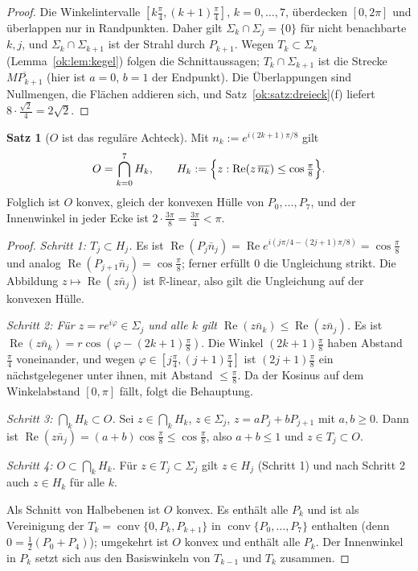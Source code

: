 \documentclass[a4paper,12pt,twoside]{report}
\theoremstyle{definition}
\newtheorem{satz}{Satz}
\begin{document}
\begin{proof}
Die Winkelintervalle $[k\frac\pi4,(k+1)\frac\pi4]$, $k=0,\dots,7$, überdecken $[0,2\pi]$ und überlappen nur in Randpunkten. Daher gilt $\Sigma_k\cap\Sigma_j=\{0\}$ für nicht benachbarte $k,j$, und $\Sigma_k\cap\Sigma_{k+1}$ ist der Strahl durch $P_{k+1}$. Wegen $T_k\subset\Sigma_k$ (Lemma~\ref{ok:lem:kegel}) folgen die Schnittaussagen; $T_k\cap\Sigma_{k+1}$ ist die Strecke $\overline{MP_{k+1}}$ (hier ist $a=0$, $b=1$ der Endpunkt). Die Überlappungen sind Nullmengen, die Flächen addieren sich, und Satz~\ref{ok:satz:dreieck}(f) liefert $8\cdot\frac{\sqrt2}4=2\sqrt2$.
\end{proof}

\begin{satz}[$O$ ist das reguläre Achteck]\label{ok:satz:konvex}
Mit $n_k:=e^{i(2k+1)\pi/8}$ gilt
\[
O=\bigcap_{k=0}^7H_k,\qquad H_k:=\Bigl\{z:\operatorname{Re}(z\,\overline{n_k})\le\cos\tfrac\pi8\Bigr\}.
\]
Folglich ist $O$ konvex, gleich der konvexen Hülle von $P_0,\dots,P_7$, und der Innenwinkel in jeder Ecke ist $2\cdot\frac{3\pi}8=\frac{3\pi}4<\pi$.
\end{satz}

\begin{proof}
\emph{Schritt 1: $T_j\subset H_j$.} Es ist $\operatorname{Re}(P_j\bar n_j)=\operatorname{Re}e^{i(j\pi/4-(2j+1)\pi/8)}=\cos\frac\pi8$ und analog $\operatorname{Re}(P_{j+1}\bar n_j)=\cos\frac\pi8$; ferner erfüllt $0$ die Ungleichung strikt. Die Abbildung $z\mapsto\operatorname{Re}(z\bar n_j)$ ist $\mathbb{R}$-linear, also gilt die Ungleichung auf der konvexen Hülle.

\emph{Schritt 2: Für $z=re^{i\varphi}\in\Sigma_j$ und alle $k$ gilt $\operatorname{Re}(z\bar n_k)\le\operatorname{Re}(z\bar n_j)$.} Es ist $\operatorname{Re}(z\bar n_k)=r\cos(\varphi-(2k+1)\frac\pi8)$. Die Winkel $(2k+1)\frac\pi8$ haben Abstand $\frac\pi4$ voneinander, und wegen $\varphi\in[j\frac\pi4,(j+1)\frac\pi4]$ ist $(2j+1)\frac\pi8$ ein nächstgelegener unter ihnen, mit Abstand $\le\frac\pi8$. Da der Kosinus auf dem Winkelabstand $[0,\pi]$ fällt, folgt die Behauptung.

\emph{Schritt 3: $\bigcap_kH_k\subset O$.} Sei $z\in\bigcap_kH_k$, $z\in\Sigma_j$, $z=aP_j+bP_{j+1}$ mit $a,b\ge0$. Dann ist $\operatorname{Re}(z\bar n_j)=(a+b)\cos\frac\pi8\le\cos\frac\pi8$, also $a+b\le1$ und $z\in T_j\subset O$.

\emph{Schritt 4: $O\subset\bigcap_kH_k$.} Für $z\in T_j\subset\Sigma_j$ gilt $z\in H_j$ (Schritt 1) und nach Schritt 2 auch $z\in H_k$ für alle $k$.

Als Schnitt von Halbebenen ist $O$ konvex. Es enthält alle $P_k$ und ist als Vereinigung der $T_k=\operatorname{conv}\{0,P_k,P_{k+1}\}$ in $\operatorname{conv}\{P_0,\dots,P_7\}$ enthalten (denn $0=\frac12(P_0+P_4)$); umgekehrt ist $O$ konvex und enthält alle $P_k$. Der Innenwinkel in $P_k$ setzt sich aus den Basiswinkeln von $T_{k-1}$ und $T_k$ zusammen.
\end{proof}
\end{document}
